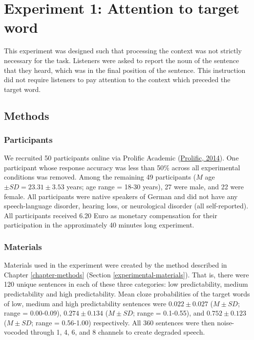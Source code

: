 \documentclass[a4paper, nobind]{templates/ociamthesis}
\begin{document}
\hypertarget{experiment1a}{%
\section{Experiment 1: Attention to target word}\label{experiment1a}}

This experiment was designed such that processing the context was not strictly necessary for the task.
Listeners were asked to report the noun of the sentence that they heard, which was in the final position of the sentence.
This instruction did not require listeners to pay attention to the context which preceded the target word.

\hypertarget{methods}{%
\subsection{Methods}\label{methods}}

\hypertarget{participants}{%
\subsubsection{Participants}\label{participants}}

We recruited 50 participants online via Prolific Academic (\protect\hyperlink{ref-Prolific}{Prolific, 2014}).
One participant whose response accuracy was less than 50\% across all experimental conditions was removed.
Among the remaining 49 participants (\(M\) age \(\pm SD=23.31\pm 3.53\) years; age range = 18-30 years), 27 were male, and 22 were female.
All participants were native speakers of German and did not have any speech-language disorder, hearing loss, or neurological disorder (all self-reported).
All participants received 6.20 Euro as monetary compensation for their participation in the approximately 40 minutes long experiment.

\hypertarget{materials}{%
\subsubsection{Materials}\label{materials}}

Materials used in the experiment were created by the method described in Chapter \ref{chapter-methods} (Section \ref{experimental-materials}).
That is, there were 120 unique sentences in each of these three categories: low predictability, medium predictability and high predictability.
Mean cloze probabilities of the target words of low, medium and high predictability sentences were \(0.022\pm0.027\) (\(M\pm SD\); range = 0.00-0.09), \(0.274\pm0.134\) (\(M\pm SD\); range = 0.1-0.55), and \(0.752\pm0.123\) (\(M\pm SD\); range = 0.56-1.00) respectively.
All 360 sentences were then noise-vocoded through 1, 4, 6, and 8 channels to create degraded speech.
\end{document}
